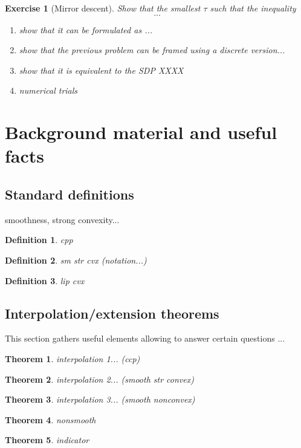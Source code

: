 \documentclass[11pt,a4paper]{article}
\newtheorem{exercise}{Exercise}
\newtheorem{theorem}{Theorem}
\newtheorem{definition}{Definition}
\begin{document}
	\begin{exercise}[Mirror descent]
	Show that the smallest $\tau$ such that the inequality
	\[ ... \]
	\begin{enumerate}
	\item show that it can be formulated as ...
	\item show that the previous problem can be framed using a discrete version...
	\item show that it is equivalent to the SDP XXXX
	\item numerical trials
	\end{enumerate}
	\end{exercise}
	

	
	\section{Background material and useful facts}			%
	\label{sec:background}
	\subsection{Standard definitions}
	smoothness, strong convexity...
	\begin{definition}\label{def:ccp}
	cpp
	\end{definition}
	\begin{definition}\label{def:smoothstronglyconvex}
	sm str cvx (notation...)
	\end{definition}
	\begin{definition}\label{def:Lipschitzcvx}
	lip cvx
	\end{definition}
	
	\subsection{Interpolation/extension theorems}
	This section gathers useful elements allowing to answer certain questions ...
	\begin{theorem}
	interpolation 1... (ccp)
	\end{theorem}
	\begin{theorem}\label{thm:interp_smoothstronglyconvex}
	interpolation 2... (smooth str convex)
	\end{theorem}
	\begin{theorem}
	interpolation 3... (smooth nonconvex)
	\end{theorem}
	\begin{theorem}
	nonsmooth
	\end{theorem}
	\begin{theorem}
	indicator
	\end{theorem}

{}
\end{document}
